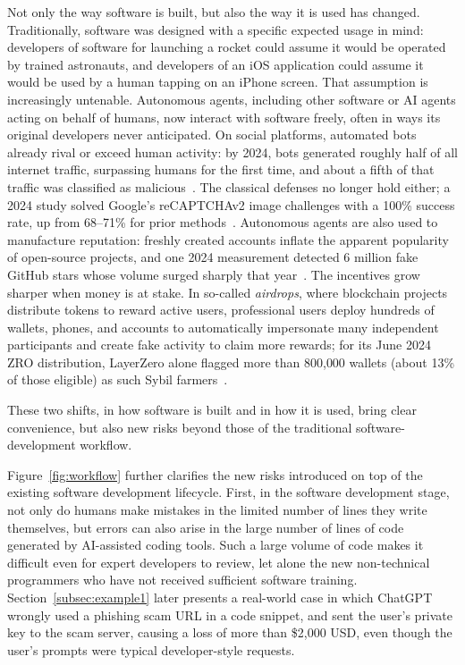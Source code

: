 Not only the way software is built, but also the way it is used has changed.
Traditionally,
software was designed with a specific expected 
usage in mind: developers of software
for launching a rocket could assume it 
would be operated by trained
astronauts, and developers of an iOS application 
could assume it would be used by a human tapping on an
iPhone screen. 
That assumption is increasingly untenable. 
Autonomous
agents, including other software or AI agents
acting on behalf of humans, now interact with software freely, 
often
in ways its original developers never anticipated. 
On social platforms,
automated bots already rival or exceed human activity: by 2024,
bots generated roughly half of all internet traffic, 
surpassing humans
for the first time, and about a fifth of that traffic was classified as
malicious~\cite{imperva2024badbot}. 
The classical defenses no longer
hold either; a 2024 study solved Google's reCAPTCHAv2 image challenges
with a 100\% success rate, up from 68--71\% for prior
methods~\cite{plesner2024recaptcha}. 
Autonomous
agents are also used to
manufacture reputation: freshly created accounts 
inflate the apparent
popularity of open-source projects, and one 2024 measurement detected
6 million fake GitHub stars whose volume surged sharply that
year~\cite{he2024fakestars}. 
The incentives grow sharper when money is
at stake. In so-called \emph{airdrops}, where blockchain projects
distribute tokens to reward active users, professional users 
deploy hundreds of
wallets, phones, and accounts to automatically 
impersonate many independent
participants and create fake activity to claim more rewards; 
for its June 2024 ZRO distribution, LayerZero alone
flagged more than 800{,}000 wallets (about 13\% of those
eligible) as such Sybil farmers~\cite{layerzero2024airdrop}.



These two shifts, in how software is built and in how it is
used, bring clear convenience, but also new risks
beyond those of the traditional software-development workflow.

Figure~\ref{fig:workflow} further clarifies the
new risks introduced on top of the existing software development
lifecycle. First, in the software development stage, not 
only do humans
make mistakes in the limited number of lines they write themselves, 
but
errors can also arise in the large number of lines of code generated by
AI-assisted coding tools. Such a large volume of code makes it
difficult even for expert developers to review, let alone the new
non-technical programmers who have not received sufficient software
training. Section~\ref{subsec:example1} later presents a
real-world case in which ChatGPT wrongly used a 
phishing scam URL in a code snippet, and
sent the user's private key to the scam server,
causing a loss of more than \$2,000 USD,
even though the user's prompts were
typical developer-style requests.


